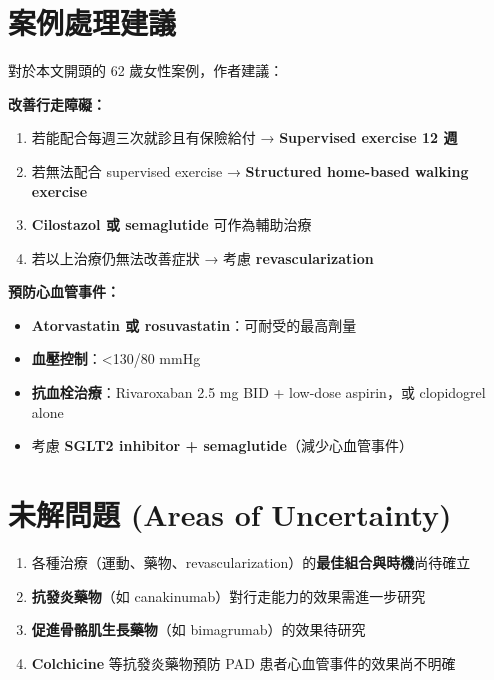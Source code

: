 \documentclass[12pt,a4paper]{article}
\begin{document}
\section{案例處理建議}

對於本文開頭的 62 歲女性案例，作者建議：

\textbf{改善行走障礙：}
\begin{enumerate}[leftmargin=2em]
    \item 若能配合每週三次就診且有保險給付 → \textbf{Supervised exercise 12 週}
    \item 若無法配合 supervised exercise → \textbf{Structured home-based walking exercise}
    \item \textbf{Cilostazol 或 semaglutide} 可作為輔助治療
    \item 若以上治療仍無法改善症狀 → 考慮 \textbf{revascularization}
\end{enumerate}

\textbf{預防心血管事件：}
\begin{itemize}[leftmargin=2em]
    \item \textbf{Atorvastatin 或 rosuvastatin}：可耐受的最高劑量
    \item \textbf{血壓控制}：<130/80 mmHg
    \item \textbf{抗血栓治療}：Rivaroxaban 2.5 mg BID + low-dose aspirin，或 clopidogrel alone
    \item 考慮 \textbf{SGLT2 inhibitor + semaglutide}（減少心血管事件）
\end{itemize}

\section{未解問題 (Areas of Uncertainty)}

\begin{enumerate}[leftmargin=2em]
    \item 各種治療（運動、藥物、revascularization）的\textbf{最佳組合與時機}尚待確立
    \item \textbf{抗發炎藥物}（如 canakinumab）對行走能力的效果需進一步研究
    \item \textbf{促進骨骼肌生長藥物}（如 bimagrumab）的效果待研究
    \item \textbf{Colchicine} 等抗發炎藥物預防 PAD 患者心血管事件的效果尚不明確
\end{enumerate}
\end{document}
